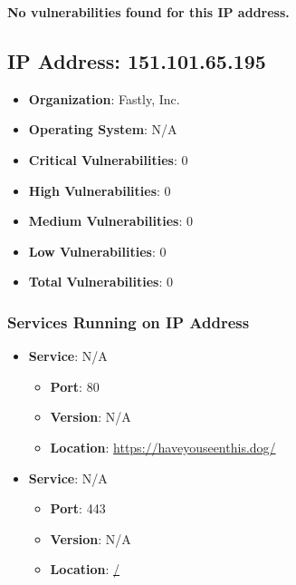 \documentclass{article}
\begin{document}
\textbf{No vulnerabilities found for this IP address.}




\clearpage



\subsection*{IP Address: 151.101.65.195}

\begin{itemize}
    \item \textbf{Organization}: Fastly, Inc.
    \item \textbf{Operating System}:  N/A 
    \item \textbf{Critical Vulnerabilities}: 0
    \item \textbf{High Vulnerabilities}: 0
    \item \textbf{Medium Vulnerabilities}: 0
    \item \textbf{Low Vulnerabilities}: 0
    \item \textbf{Total Vulnerabilities}: 0
\end{itemize}

\subsubsection*{Services Running on IP Address}

\begin{itemize}
    
        \item \textbf{Service}: N/A
        \begin{itemize}
            \item \textbf{Port}: 80
            \item \textbf{Version}:  N/A 
            \item \textbf{Location}: \href{ https://haveyouseenthis.dog/ }{ https://haveyouseenthis.dog/ }
        \end{itemize}
    
        \item \textbf{Service}: N/A
        \begin{itemize}
            \item \textbf{Port}: 443
            \item \textbf{Version}:  N/A 
            \item \textbf{Location}: \href{ / }{ / }
        \end{itemize}
    
\end{itemize}
\end{document}
